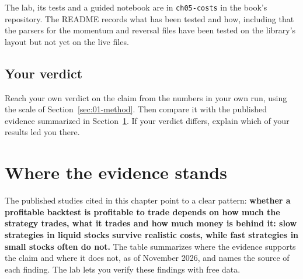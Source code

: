 The lab, its tests and a guided notebook are in \texttt{ch05-costs} in the book's repository. The README records what has been tested and how, including that the parsers for the momentum and reversal files have been tested on the library's layout but not yet on the live files.

\subsection*{Your verdict}

Reach your own verdict on the claim from the numbers in your own run, using the scale of Section~\ref{sec:01-method}. Then compare it with the published evidence summarized in Section~\ref{sec:17-verdict}. If your verdict differs, explain which of your results led you there.

\section{Where the evidence stands}
\label{sec:17-verdict}

The published studies cited in this chapter point to a clear pattern: \textbf{whether a profitable backtest is profitable to trade depends on how much the strategy trades, what it trades and how much money is behind it: slow strategies in liquid stocks survive realistic costs, while fast strategies in small stocks often do not.} The table summarizes where the evidence supports the claim and where it does not, as of November 2026, and names the source of each finding. The lab lets you verify these findings with free data.

